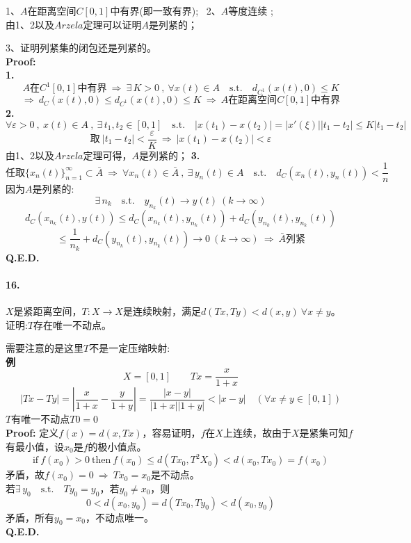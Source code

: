 1、$A$在距离空间$C[0,1]$中有界(即一致有界); \ 2、$A$等度连续 ;\\
由1、2以及$Arzela$定理可以证明$A$是列紧的；

3、证明列紧集的闭包还是列紧的。\\
\textbf{Proof:}\\
\textbf{1.}
\[A\text{在}C^1[0,1]\text{中有界} \ \Rightarrow \ \exists \, K>0 \ , \ \forall x(t) \in A \quad \text{s.t.} \quad d_{C^1}(x(t),0) \leq K\]
\[\Rightarrow \ d_C(x(t),0) \leq d_{C^1}(x(t),0) \leq K \ \Rightarrow \ \text{$A$在距离空间$C[0,1]$中有界}\]
\textbf{2.}
\[\forall \varepsilon>0 \ , \ x(t) \in A \ , \ \exists \, t_1,t_2 \in [0,1] \quad \text{s.t.} \quad |x(t_1)-x(t_2)|=|x'(\xi)||t_1-t_2| \leq K|t_1-t_2|\]
\[\text{取} \ |t_1-t_2|<\frac{\varepsilon}{K} \ \Rightarrow \ |x(t_1)-x(t_2)|<\varepsilon\]
由1、2以及$Arzela$定理可得，$A$是列紧的；
\textbf{3.}
\[\text{任取}\{x_n(t)\}_{n=1}^{\infty} \subset \bar{A} \ \Rightarrow \ \forall x_n(t) \in \bar{A} \ , \ \exists \, y_n(t) \in A \quad \text{s.t.} \quad d_C(x_n(t),y_n(t))<\frac{1}{n}\]
因为$A$是列紧的:
\[\exists \, n_k \quad \text{s.t.} \quad y_{n_k}(t) \to y(t) \ (k \to \infty)\]
\[d_C(x_{n_k}(t),y(t)) \leq d_C(x_{n_k}(t),y_{n_k}(t))+d_C(y_{n_k}(t),y_{n_k}(t))\]
\[\leq \frac{1}{n_k}+d_C(y_{n_k}(t),y_{n_k}(t)) \to 0 \ (k \to \infty) \ \Rightarrow \ \bar{A}\text{列紧}\]
\textbf{Q.E.D.}

\paragraph*{16.}$X$是紧距离空间，$T:X \to X$是连续映射，满足$d(Tx,Ty)<d(x,y) \ \forall x \neq y$。\\
证明:$T$存在唯一不动点。

需要注意的是这里$T$不是一定压缩映射:\\
\textbf{例}
\[X=[0,1] \qquad Tx=\frac{x}{1+x}\]
\[|Tx-Ty|=\left|\frac{x}{1+x}-\frac{y}{1+y}\right|=\frac{|x-y|}{|1+x||1+y|}<|x-y| \quad (\forall x \neq y \in [0,1])\]
$T$有唯一不动点$T0=0$\\
\textbf{Proof:} 定义$f(x)=d(x,Tx)$，容易证明，$f$在$X$上连续，故由于$X$是紧集可知$f$有最小值，设$x_0$是$f$的极小值点。
\[\text{if} \ f(x_0)>0 \ \text{then} \ f(x_0) \leq d(Tx_0,T^2X_0)<d(x_0,Tx_0)=f(x_0)\]
矛盾，故$f(x_0)=0 \ \Rightarrow \ Tx_0=x_0$是不动点。\\
若$\exists \, y_0 \quad \text{s.t.} \quad Ty_0=y_0$，若$y_0 \neq x_0$，则
\[0<d(x_0,y_0)=d(Tx_0,Ty_0)<d(x_0,y_0)\]
矛盾，所有$y_0=x_0$，不动点唯一。\\
\textbf{Q.E.D.}

